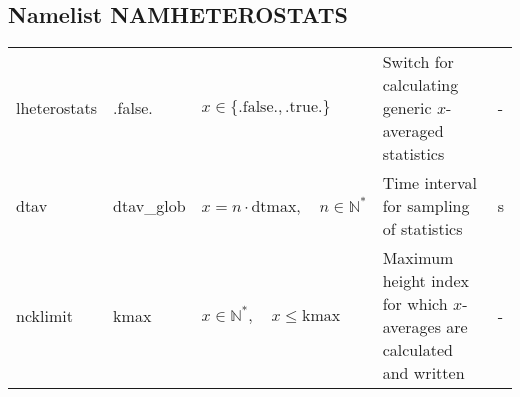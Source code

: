 \documentclass[twoside,11pt,fleqn,a4paper,english,openright]{report}
\begin{document}
\subsection{Namelist NAMHETEROSTATS}\label{par:namheterostats}
\begin{center}
  \tablelasttail{
        &&&&\\\hline
  }
\begin{supertabular}{|l|p{2cm}|p{4cm}|p{6cm}|l|}
  lheterostats		& .false.	& $x\in\{\text{.false.},\text{.true.}\}$	& Switch for calculating generic $x$-averaged statistics	& -\\
  dtav		& dtav\_glob	& $x = n \cdot \text{dtmax}, \quad n \in \mathbb{N}^*$	& Time interval for sampling of statistics	& s\\
  ncklimit& kmax &  $x \in \mathbb{N}^*, \quad x \le \text{kmax}$ & Maximum height index for which $x$-averages are calculated and written & -\\ 
\end{supertabular}
\end{center}

\newpage
\end{document}
